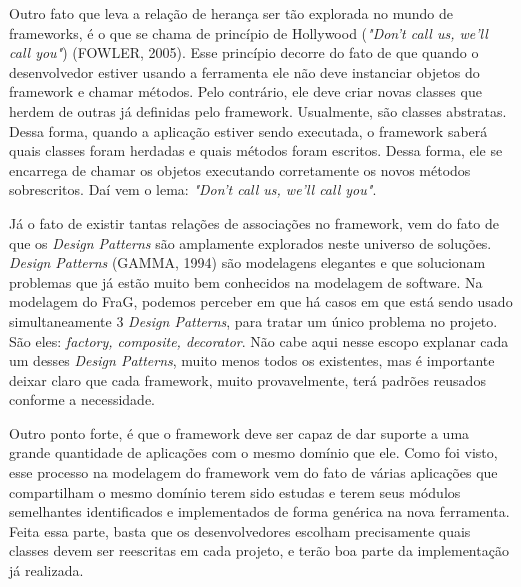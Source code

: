 \documentclass[
    12pt,       %
    openright,      %
    twoside,      %
    a4paper,      %
    english,      %
    french,       %
    spanish,      %
    brazil,       %
    ]{abntex2}
\begin{document}
          Outro fato que leva a relação de herança ser tão explorada no mundo de frameworks,
          é o que se chama de princípio de Hollywood (\textit{"Don't call us, we'll call you"})
          (FOWLER, 2005). Esse princípio decorre do fato de que quando o desenvolvedor estiver
          usando a ferramenta ele não deve instanciar objetos do framework e chamar métodos. Pelo
          contrário, ele deve criar novas classes que herdem de outras já definidas pelo
          framework. Usualmente, são classes abstratas. Dessa forma, quando a aplicação
          estiver sendo executada, o framework saberá quais classes foram herdadas e
          quais métodos foram escritos. Dessa forma, ele se encarrega de chamar
          os objetos executando corretamente os novos métodos sobrescritos. Daí
          vem o lema: \textit{"Don't call us, we'll call you"}.

          Já o fato de existir tantas relações de associações no framework, vem
          do fato de que os \textit{Design Patterns} são amplamente explorados neste universo de
          soluções. \textit{Design Patterns} (GAMMA, 1994) são modelagens
          elegantes e que solucionam problemas que já estão muito bem conhecidos na
          modelagem de software. Na modelagem do FraG, podemos perceber em que há
          casos em que está sendo usado simultaneamente 3 \textit{Design Patterns}, para tratar um único problema no projeto.
          São eles: \textit{factory, composite, decorator}. Não cabe aqui nesse escopo explanar
          cada um desses \textit{Design Patterns}, muito menos todos os existentes,
          mas é importante deixar claro que cada framework, muito provavelmente, terá
          padrões reusados conforme a necessidade.

          Outro ponto forte, é que o framework deve ser capaz de dar suporte a
          uma grande quantidade de aplicações com o mesmo domínio que ele. Como foi
          visto, esse processo na modelagem do framework vem do fato de várias
          aplicações que compartilham o mesmo domínio terem sido
          estudas e terem seus módulos semelhantes identificados e implementados
          de forma genérica na nova ferramenta. Feita essa parte, basta que
          os desenvolvedores escolham precisamente quais classes devem ser reescritas
          em cada projeto, e terão boa parte da implementação já realizada.

\end{document}
